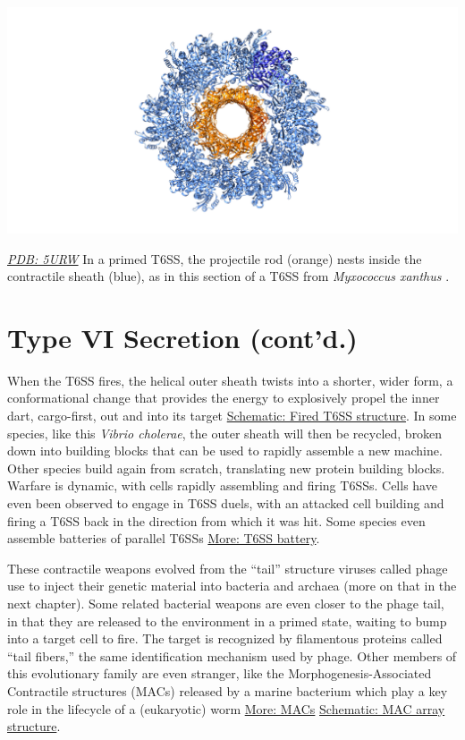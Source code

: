 \documentclass[]{tufte-book}
\begin{document}
\includegraphics{img/schematics/9_6_1}

\href{http://rcsb.org/structure/5URW}{\emph{PDB: 5URW}}
In a primed T6SS, the projectile rod (orange) nests inside the contractile sheath (blue), as in this section of a T6SS from \emph{Myxococcus xanthus} \citep{chang2017}.

\hypertarget{type-vi-secretion-contd.}{%
\section{Type VI Secretion (cont'd.)}\label{type-vi-secretion-contd.}}

When the T6SS fires, the helical outer sheath twists into a shorter, wider form, a conformational change that provides the energy to explosively propel the inner dart, cargo-first, out and into its target \protect\hyperlink{Fired_T6SS_structure}{Schematic: Fired T6SS structure}. In some species, like this \emph{Vibrio cholerae}, the outer sheath will then be recycled, broken down into building blocks that can be used to rapidly assemble a new machine. Other species build again from scratch, translating new protein building blocks. Warfare is dynamic, with cells rapidly assembling and firing T6SSs. Cells have even been observed to engage in T6SS duels, with an attacked cell building and firing a T6SS back in the direction from which it was hit. Some species even assemble batteries of parallel T6SSs \protect\hyperlink{T6SS_battery}{More: T6SS battery}.

These contractile weapons evolved from the ``tail'' structure viruses called phage use to inject their genetic material into bacteria and archaea (more on that in the next chapter). Some related bacterial weapons are even closer to the phage tail, in that they are released to the environment in a primed state, waiting to bump into a target cell to fire. The target is recognized by filamentous proteins called ``tail fibers,'' the same identification mechanism used by phage. Other members of this evolutionary family are even stranger, like the Morphogenesis-Associated Contractile structures (MACs) released by a marine bacterium which play a key role in the lifecycle of a (eukaryotic) worm \protect\hyperlink{MACs}{More: MACs} \protect\hyperlink{MAC_array_structure}{Schematic: MAC array structure}.
\end{document}
